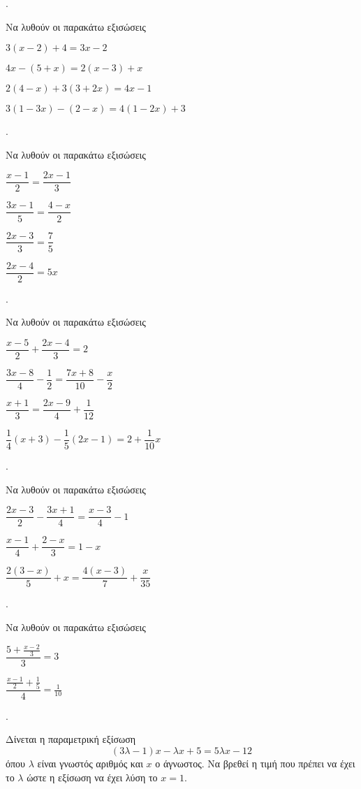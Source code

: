 \documentclass[11pt,a4paper,twocolumn]{article}
\newcounter{askhsh}
\newcommand{\askhsh}{{\large\theaskhsh.}\ \addtocounter{askhsh}{1}}
\begin{document}
\askhsh Να λυθούν οι παρακάτω εξισώσεις
\begin{alist}
\item $ 3(x-2)+4=3x-2 $
\item $ 4x-(5+x)=2(x-3)+x $
\item $ 2(4-x)+3(3+2x)=4x-1 $
\item $ 3(1-3x)-(2-x)=4(1-2x)+3 $
\end{alist}
\askhsh Να λυθούν οι παρακάτω εξισώσεις
\begin{multicols}{2}
\begin{alist}[leftmargin=4mm]
\item $ \dfrac{x-1}{2}=\dfrac{2x-1}{3} $
\item $ \dfrac{3x-1}{5}=\dfrac{4-x}{2} $
\item $ \dfrac{2x-3}{3}=\dfrac{7}{5} $
\item $ \dfrac{2x-4}{2}=5x $
\end{alist}
\end{multicols}
\askhsh Να λυθούν οι παρακάτω εξισώσεις
\begin{alist}
\item $ \dfrac{x-5}{2}+\dfrac{2x-4}{3}=2 $
\item $ \dfrac{3x-8}{4}-\dfrac{1}{2}=\dfrac{7x+8}{10}-\dfrac{x}{2} $
\item $ \dfrac{x+1}{3}=\dfrac{2x-9}{4}+\dfrac{1}{12} $
\item $ \dfrac{1}{4}(x+3)-\dfrac{1}{5}(2x-1)=2+\dfrac{1}{10}x $
\end{alist}
\askhsh Να λυθούν οι παρακάτω εξισώσεις
\begin{alist}
\item $ \dfrac{2x-3}{2}-\dfrac{3x+1}{4}=\dfrac{x-3}{4}-1 $
\item $ \dfrac{x-1}{4}+\dfrac{2-x}{3}=1-x $
\item $ \dfrac{2(3-x)}{5}+x=\dfrac{4(x-3)}{7}+\dfrac{x}{35} $
\end{alist}
\askhsh Να λυθούν οι παρακάτω εξισώσεις
\begin{multicols}{2}
\begin{alist}
\item $ \dfrac{5+\frac{x-2}{3}}{3}=3 $
\item $ \dfrac{\frac{x-1}{2}+\frac{1}{5}}{4}=\frac{1}{10} $
\end{alist}
\end{multicols}
\askhsh Δίνεται η παραμετρική εξίσωση \[ (3\lambda-1)x-\lambda x+5=5\lambda x-12 \]
όπου $ \lambda $ είναι γνωστός αριθμός και $ x $ ο άγνωστος. Να βρεθεί η τιμή που πρέπει να έχει το $ \lambda $ ώστε η εξίσωση να έχει λύση το $ x=1 $.\\\\
\end{document}
